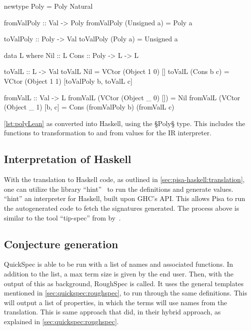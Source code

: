 \begin{listing}[H]
\begin{HaskellCode}
newtype Poly = Poly Natural

fromValPoly :: Val -> Poly
fromValPoly (Unsigned a) = Poly a

toValPoly :: Poly -> Val
toValPoly (Poly a) = Unsigned a

data L where
  Nil :: L
  Cons :: Poly -> L -> L

toValL :: L -> Val
toValL Nil        = VCtor (Object 1 0) []
toValL (Cons b c) = VCtor (Object 1 1) [toValPoly b, toValL c]

fromValL :: Val -> L
fromValL (VCtor (Object _ 0) [])    = Nil
fromValL (VCtor (Object _ 1) [b, c] = Cons (fromValPoly b) (fromValL c)
\end{HaskellCode}
\caption[\cref{lst:polyLean} as converted into Haskell.]{
  \cref{lst:polyLean} as converted into Haskell, using the §Poly§ type.
  This includes the functions to transformation to and from values for the IR interpreter.
}
\label{lst:poly}
\end{listing}

\vspace{-0.93cm}
\subsection{Interpretation of Haskell}\label{sec:pisa-haskell:interpretation}
With the translation to Haskell code, as outlined in \cref{sec:pisa-haskell:translation}, one can utilize the library ``hint''~\autocite{Hint} to run the definitions and generate values.
``hint'' an interpreter for Haskell, built upon GHC's API.
This allows Pisa to run the autogenerated code to fetch the signatures generated.
The process above is similar to the tool ``tip-spec'' from  by~\cite{TIP}.

\subsection{Conjecture generation}\label{sec:pisa-haskell:conjecture-generation}
QuickSpec is able to be run with a list of names and associated functions.
In addition to the list, a max term size is given by the end user.
Then, with the output of this as background, RoughSpec is called.
It uses the general templates mentioned in \cref{sec:quickspec:roughspec}, to run through the same definitions.
This will output a list of properties, in which the terms will use names from the translation.
This is same approach that \citeauthor{Roughspec} did, in their hybrid approach, as explained in \cref{sec:quickspec:roughspec}.


